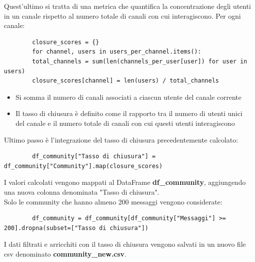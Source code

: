 \documentclass[12pt]{article}
\begin{document}
	Quest'ultimo si tratta di una metrica che quantifica la concentrazione degli utenti in un canale rispetto al numero totale di canali con cui interagiscono. Per ogni canale:
	\begin{lstlisting}
		closure_scores = {}
		for channel, users in users_per_channel.items():
		total_channels = sum(len(channels_per_user[user]) for user in users)
		closure_scores[channel] = len(users) / total_channels
	\end{lstlisting}
	\begin{itemize}[label=]
		\item Si somma il numero di canali associati a ciascun utente del canale corrente
		\item Il tasso di chiusura è definito come il rapporto tra il numero di utenti unici del canale e il numero totale di canali con cui questi utenti interagiscono
	\end{itemize}
	Ultimo passo è l'integrazione del tasso di chiusura precedentemente calcolato:
	\begin{lstlisting}
		df_community["Tasso di chiusura"] = df_community["Community"].map(closure_scores)
	\end{lstlisting}
	I valori calcolati vengono mappati al DataFrame \textbf{df\_community}, aggiungendo una nuova colonna denominata "Tasso di chiusura".\\
	Solo le community che hanno almeno 200 messaggi vengono considerate:
	\begin{lstlisting}
		df_community = df_community[df_community["Messaggi"] >= 200].dropna(subset=["Tasso di chiusura"])
	\end{lstlisting}
	I dati filtrati e arricchiti con il tasso di chiusura vengono salvati in un nuovo file csv denominato \textbf{community\_new.csv}.
\end{document}
